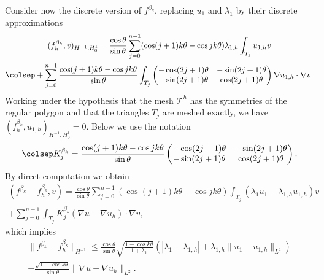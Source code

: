 Consider now the discrete version of $f^{\beta_k}$, replacing $u_1$ and $\lambda_1$ by their discrete approximations
\vspace*{-8pt}
\begin{multline*}
(f_h^{\beta_k},v)_{H^{-1},H_0^1} = \frac{\cos \theta}{\sin \theta}\sum_{j=0}^{n-1} (\cos(j+1)k\theta-\cos jk\theta) \lambda_{1,h} \int_{T_j} u_{1,h}v\\\colsep
+ \sum_{j=0}^{n-1} \frac{\cos(j+1)k\theta-\cos jk\theta}{\sin \theta} \int_{T_j}\begin{pmatrix}
-\cos (2j+1)\theta & -\sin (2j+1) \theta \\
-\sin (2j+1)\theta & \cos (2j+1)\theta
\end{pmatrix}\nabla u_{1,h} \cdot \nabla v.
\end{multline*}
Working under the hypothesis that the mesh $\mathcal T^h$ has the symmetries of the regular polygon and that the triangles $T_j$ are meshed exactly, we have $(f_h^{\beta_k},u_{1,h})_{H^{-1},H_0^1} = 0$. Below we use the notation
\[\colsep
K_j^{\beta_k} = \frac{\cos(j+1)k\theta-\cos jk\theta}{\sin \theta} \begin{pmatrix}
-\cos (2j+1)\theta & -\sin (2j+1) \theta \\
-\sin(2j+1)\theta & \cos (2j+1)\theta
\end{pmatrix}.
\]
By direct computation we obtain\vspace*{-5pt}
\begin{multline*}
(f^{\beta_k}-f^{\beta_k}_h,v) 
= \frac{\cos \theta}{\sin \theta}\sum_{j=0}^{n-1} (\cos (j+1)k\theta-\cos jk\theta) \int_{T_j}(\lambda_1 u_1-\lambda_{1,h}u_{1,h})v\\
+ \sum_{j=0}^{n-1} \int_{T_j}K_j^{\beta_k}(\nabla u - \nabla u_h)\cdot \nabla v,
\end{multline*}
which implies
\vspace*{-5pt}
\begin{multline*}
\|f^{\beta_k}-f_h^{\beta_k} \|_{H^{-1}}\leq \frac{\cos \theta}{\sin \theta} \sqrt{\frac{1-\cos k\theta}{1+\lambda_1}}(|\lambda_1-\lambda_{1,h}|+\lambda_{1,h}\|u_1-u_{1,h}\|_{L^2}) \\
+ \frac{\sqrt{1-\cos k\theta}}{\sin \theta} \|\nabla u-\nabla u_h\|_{L^2}.
\end{multline*}

